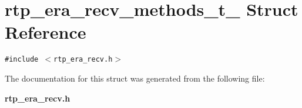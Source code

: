 \section{rtp\_\-era\_\-recv\_\-methods\_\-t\_\- Struct Reference}
\label{structrtp__era__recv__methods__t__}
{\tt \#include $<$rtp\_\-era\_\-recv.h$>$}



The documentation for this struct was generated from the following file:\begin{CompactItemize}
\item 
\bf{rtp\_\-era\_\-recv.h}\end{CompactItemize}
